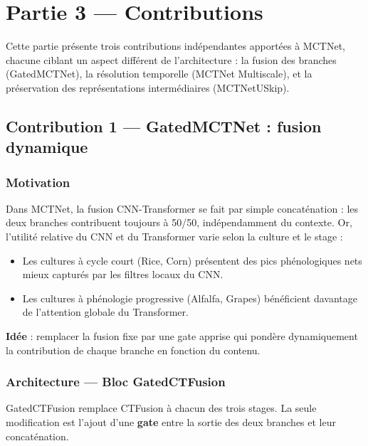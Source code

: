 
\chapter{Partie 3 — Contributions}
\label{chap:partie3}

Cette partie présente trois contributions indépendantes apportées à MCTNet,
chacune ciblant un aspect différent de l'architecture : la fusion des branches
(GatedMCTNet), la résolution temporelle (MCTNet Multiscale), et la
préservation des représentations intermédiaires (MCTNetUSkip).

\section{Contribution 1 — GatedMCTNet : fusion dynamique}
\label{sec:gated}

\subsection{Motivation}

Dans MCTNet, la fusion CNN-Transformer se fait par simple concaténation :
les deux branches contribuent toujours à 50/50, indépendamment du contexte.
Or, l'utilité relative du CNN et du Transformer varie selon la culture et
le stage :
\begin{itemize}
  \item Les cultures à cycle court (Rice, Corn) présentent des pics
        phénologiques nets mieux capturés par les filtres locaux du CNN.
  \item Les cultures à phénologie progressive (Alfalfa, Grapes) bénéficient
        davantage de l'attention globale du Transformer.
\end{itemize}

\textbf{Idée} : remplacer la fusion fixe par une gate apprise qui pondère
dynamiquement la contribution de chaque branche en fonction du contenu.

\subsection{Architecture — Bloc GatedCTFusion}

GatedCTFusion remplace CTFusion à chacun des trois stages. La seule
modification est l'ajout d'une \textbf{gate} entre la sortie des deux
branches et leur concaténation.

